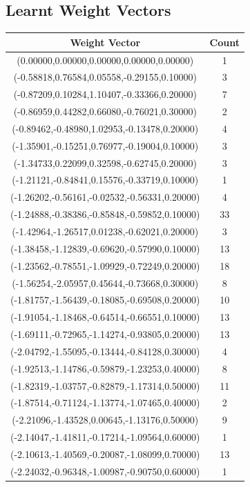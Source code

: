 \documentclass[12pt, fullpage,letterpaper]{article}
\begin{document}
\subsection{Learnt Weight Vectors}
\begin{longtable}{c|c}
Weight Vector & Count\\
\hline
(0.00000,0.00000,0.00000,0.00000,0.00000) & 1 \\
(-0.58818,0.76584,0.05558,-0.29155,0.10000) & 3 \\
(-0.87209,0.10284,1.10407,-0.33366,0.20000) & 7 \\
(-0.86959,0.44282,0.66080,-0.76021,0.30000) & 2 \\
(-0.89462,-0.48980,1.02953,-0.13478,0.20000) & 4 \\
(-1.35901,-0.15251,0.76977,-0.19004,0.10000) & 3 \\
(-1.34733,0.22099,0.32598,-0.62745,0.20000) & 3 \\
(-1.21121,-0.84841,0.15576,-0.33719,0.10000) & 1 \\
(-1.26202,-0.56161,-0.02532,-0.56331,0.20000) & 4 \\
(-1.24888,-0.38386,-0.85848,-0.59852,0.10000) & 33 \\
(-1.42964,-1.26517,0.01238,-0.62021,0.20000) & 3 \\
(-1.38458,-1.12839,-0.69620,-0.57990,0.10000) & 13 \\
(-1.23562,-0.78551,-1.09929,-0.72249,0.20000) & 18 \\
(-1.56254,-2.05957,0.45644,-0.73668,0.30000) & 8 \\
(-1.81757,-1.56439,-0.18085,-0.69508,0.20000) & 10 \\
(-1.91054,-1.18468,-0.64514,-0.66551,0.10000) & 13 \\
(-1.69111,-0.72965,-1.14274,-0.93805,0.20000) & 13 \\
(-2.04792,-1.55095,-0.13444,-0.84128,0.30000) & 4 \\
(-1.92513,-1.14786,-0.59879,-1.23253,0.40000) & 8 \\
(-1.82319,-1.03757,-0.82879,-1.17314,0.50000) & 11 \\
(-1.87514,-0.71124,-1.13774,-1.07465,0.40000) & 2 \\
(-2.21096,-1.43528,0.00645,-1.13176,0.50000) & 9 \\
(-2.14047,-1.41811,-0.17214,-1.09564,0.60000) & 1 \\
(-2.10613,-1.40569,-0.20087,-1.08099,0.70000) & 13 \\
(-2.24032,-0.96348,-1.00987,-0.90750,0.60000) & 1 \\

\end{longtable}
\end{document}
